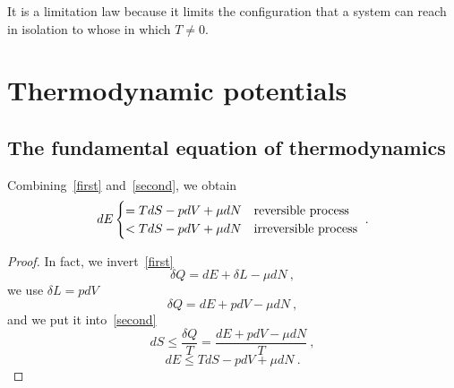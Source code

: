     It is a limitation law because it limits the configuration that a system can reach in isolation to whose in which $T \neq 0$.

\chapter{Thermodynamic potentials}

\section{The fundamental equation of thermodynamics}

    Combining~\eqref{first} and~\eqref{second}, we obtain 
    \begin{equation}\label{de}
        dE \begin{cases}
            = T dS - pdV + \mu dN & \textnormal{reversible process} \\
            < T dS - pdV + \mu dN & \textnormal{irreversible process} \\
        \end{cases} ~.
    \end{equation}
    \begin{proof}
        In fact, we invert~\eqref{first}
        \begin{equation*}
            \delta Q = dE + \delta L - \mu dN ~,
        \end{equation*}
        we use $\delta L = p dV$ 
        \begin{equation*}
            \delta Q = dE + p dV - \mu dN ~,
        \end{equation*}
        and we put it into~\eqref{second}
        \begin{equation}
            dS \leq \frac{\delta Q}{T} = \frac{dE + p dV - \mu dN}{T} ~,
        \end{equation}
        \begin{equation}
            dE \leq TdS - p dV + \mu dN ~.
        \end{equation}
    \end{proof} 

